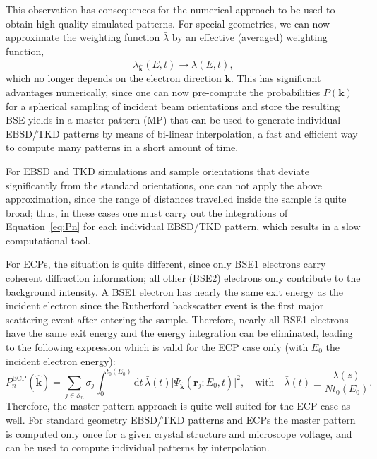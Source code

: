 This observation has consequences for the numerical approach to be used to obtain high quality simulated patterns. For special geometries, we can now approximate the weighting function $\bar{\lambda}$ by an effective (averaged) weighting function,
\begin{equation}
    \bar{\lambda}_{\hat{\mathbf{k}}}(E,t) \rightarrow \bar{\lambda}(E,t),
\end{equation}
which no longer depends on the electron direction $\mathbf{k}$.  This has significant advantages numerically, since one can now pre-compute the probabilities $P(\mathbf{k})$ for a spherical sampling of incident beam orientations and store the resulting BSE yields in a master pattern (MP) that can be used to generate individual EBSD/TKD patterns by means of bi-linear interpolation, a fast and efficient way to compute many patterns in a short amount of time.  

For EBSD and TKD simulations and sample orientations that deviate significantly from the standard orientations, one can not apply the above approximation, since the range of distances travelled inside the sample is quite broad; thus, in these cases one must carry out the integrations of Equation~\ref{eq:Pn} for each individual EBSD/TKD pattern, which results in a slow computational tool.

For ECPs, the situation is quite different, since only BSE1 electrons carry coherent diffraction information; all other (BSE2) electrons only contribute to the background intensity.  A BSE1 electron has nearly the same exit energy as the incident electron since the Rutherford backscatter event is the first major scattering event after entering the sample.  Therefore, nearly all BSE1 electrons have the same exit energy and the energy integration can be eliminated, leading to the following expression which is valid for the ECP case only (with $E_0$ the incident electron energy):
\begin{equation}
    P_n^{\text{ECP}}(\hat{\mathbf{k}}) = \sum_{j\in \mathcal{S}_n}\sigma_j
    \int_0^{t_0(E_0)}\!\!\!\!\!\!\mathrm{d}t\, \bar{\lambda}(t)\vert\Psi_{\hat{\mathbf{k}}}(\mathbf{r}_j;E_0,t)\vert^2,\quad\text{with}\quad  \bar{\lambda}(t) \equiv \frac{\lambda(z)}{N t_0(E_0)}.\label{eq:PnECP}
\end{equation}
Therefore, the master pattern approach is quite well suited for the ECP case as well. For standard geometry EBSD/TKD patterns and ECPs the master pattern is computed only once for a given crystal structure and microscope voltage, and can be used to compute individual patterns by interpolation.  


